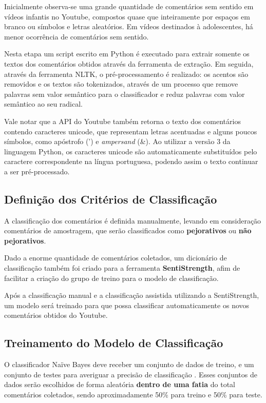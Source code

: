 Inicialmente observa-se uma grande quantidade de comentários sem sentido em vídeos infantis no Youtube, compostos quase que inteiramente por espaços em branco ou símbolos e letras aleatórios. Em vídeos destinados à adolescentes, há menor ocorrência de comentários sem sentido. 

Nesta etapa um script escrito em Python é executado para extrair somente os textos dos comentários obtidos através da ferramenta de extração. Em seguida, através da ferramenta NLTK, o pré-processamento é realizado: os acentos são removidos e os textos são tokenizados, através de um processo que remove palavras sem valor semântico para o classificador e reduz palavras com valor semântico ao seu radical.

Vale notar que a API do Youtube também retorna o texto dos comentários contendo caracteres unicode, que representam letras acentuadas e alguns poucos símbolos, como apóstrofo (') e \textit{ampersand} (\&). Ao utilizar a versão 3 da linguagem Python, os caracteres unicode são automaticamente substituídos pelo caractere correspondente na língua portuguesa, podendo assim o texto continuar a ser pré-processado.


\subsection{Definição dos Critérios de Classificação}
A classificação dos comentários é definida manualmente, levando em consideração comentários de amostragem, que serão classificados como \textbf{pejorativos} ou \textbf{não pejorativos}. 

Dado a enorme quantidade de comentários coletados, um dicionário de classificação também foi criado para a ferramenta \textbf{SentiStrength}, afim de facilitar a criação do grupo de treino para o modelo de classificação. %

Após a classificação manual e a classificação assistida utilizando a SentiStrength, um modelo será treinado para que possa classificar automaticamente os novos comentários obtidos do Youtube.

\subsection{Treinamento do Modelo de Classificação}
O classificador Naïve Bayes deve receber um conjunto de dados de treino, e um conjunto de testes para averiguar a precisão de classificação \cite{ZhangandLi2007Bayes}. Esses conjuntos de dados serão escolhidos de forma aleatória \textbf{dentro de uma fatia} do total comentários coletados, sendo aproximadamente 50\% para treino e 50\% para teste. %

